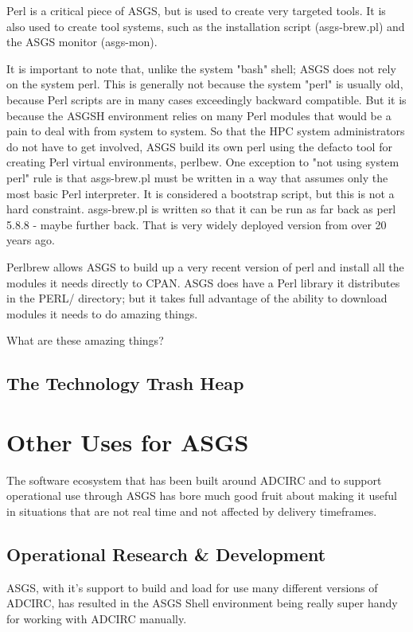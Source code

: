 \documentclass{article}
\begin{document}
Perl is a critical piece of ASGS, but is used to create very targeted tools. It
is also used to create tool systems, such as the installation script
(asgs-brew.pl) and the ASGS monitor (asgs-mon).

It is important to note that, unlike the system "bash" shell; ASGS does not rely
on the system perl. This is generally not because the system "perl" is usually
old, because Perl scripts are in many cases exceedingly backward compatible. But
it is because the ASGSH environment relies on many Perl modules that would be a
pain to deal with from system to system. So that the HPC system administrators
do not have to get involved, ASGS build its own perl using the defacto tool for
creating Perl virtual environments, perlbew. One exception to "not using system
perl" rule is that asgs-brew.pl must be written in a way that assumes only the
most basic Perl interpreter. It is considered a bootstrap script, but this is
not a hard constraint. asgs-brew.pl is written so that it can be run as far back
as perl 5.8.8 - maybe further back. That is very widely deployed version from
over 20 years ago.

Perlbrew allows ASGS to build up a very recent version of perl and install all
the modules it needs directly to CPAN. ASGS does have a Perl library it
distributes in the PERL/ directory; but it takes full advantage of the ability
to download modules it needs to do amazing things.

What are these amazing things?

\subsection{The Technology Trash Heap}

\section{Other Uses for ASGS}

The software ecosystem that has been built around ADCIRC and to support
operational use through ASGS has bore much good fruit about making it useful in
situations that are not real time and not affected by delivery timeframes.

\subsection{Operational Research \& Development}

ASGS, with it's support to build and load for use many different versions of
ADCIRC, has resulted in the ASGS Shell environment being really super handy for
working with ADCIRC manually.
\end{document}
